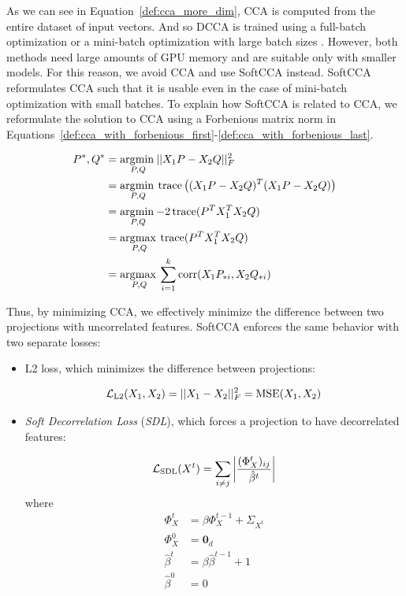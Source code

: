 As we can see in Equation~\ref{def:cca_more_dim}, CCA is computed from the
entire dataset of input vectors. And so DCCA is trained using a full-batch
optimization \citep{andrew2013deep} or a mini-batch optimization with large
batch sizes \citep{wang2015unsupervised}. However, both methods need large
amounts of GPU memory and are suitable only with smaller models. For
this reason, we avoid CCA and use SoftCCA \citep{chang2018scalable} instead.
SoftCCA reformulates CCA such that it is usable even in the case of mini-batch
optimization with small batches. To explain how SoftCCA is related to CCA, we
reformulate the solution to CCA using a Forbenious matrix norm in
Equations~\ref{def:cca_with_forbenious_first}-\ref{def:cca_with_forbenious_last}.

\begin{align}
  P^\ast, Q^\ast &= \underset{P, Q}{\operatorname*{\arg\!\min\medspace}} ||X_1P - X_2Q||^2_F \label{def:cca_with_forbenious_first} \\
  &= \underset{P, Q}{\operatorname*{\arg\!\min\medspace}} \operatorname*{trace}\left((X_1P - X_2Q)^T(X_1P - X_2Q)\right) \\
  &= \underset{P, Q}{\operatorname*{\arg\!\min\medspace}} {-2} \operatorname*{trace}(P^TX_1^TX_2Q) \\
  &= \underset{P, Q}{\operatorname*{\arg\!\max\medspace}} \operatorname*{trace}(P^TX_1^TX_2Q) \\
  &= \underset{P, Q}{\operatorname*{\arg\!\max\medspace}} \sum_{i = 1}^k \operatorname*{corr}(X_1P_{*i}, X_2Q_{*i}) \label{def:cca_with_forbenious_last}
\end{align}

Thus, by minimizing CCA, we effectively minimize the difference between two
projections with uncorrelated features. SoftCCA enforces the same behavior with
two separate losses:

\begin{itemize}

  \item L2 loss, which minimizes the difference between projections:

    \begin{equation}
      \mathcal{L}_{\text{L2}}(X_1, X_2) = ||X_1 - X_2||^2_F = \operatorname*{MSE}(X_1, X_2)
    \end{equation}

  \item \emph{Soft Decorrelation Loss} (\emph{SDL}), which forces a projection
    to have decorrelated features:

    \begin{equation}
      \mathcal{L}_{\text{SDL}}(X^t) = \sum_{i \ne j} \left|
          \frac{(\Phi^t_X)_{ij}}{\hat{\beta}^t}
          \right|
    \end{equation}
    where
    \begin{align}
      \Phi^t_X &= \beta \Phi^{t-1}_X + \Sigma_{X^t} \\
      \Phi^0_X &= \bm{0}_d \\
      \hat{\beta}^t &= \beta \hat{\beta}^{t-1} + 1 \\
      \hat{\beta}^0 &= 0
    \end{align}

\end{itemize}

